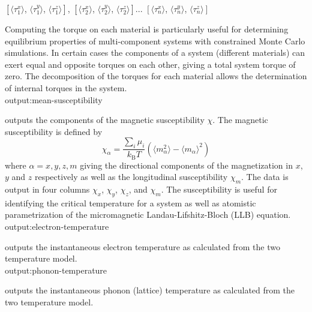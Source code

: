 \begin{center}
$\left[ \langle\tau_1^x \rangle \right.$, $\langle\tau_1^y \rangle$, $\left. \langle\tau_1^z \rangle \right]$,
$\left[ \langle\tau_2^x \rangle \right.$, $\langle\tau_2^y \rangle$, $\left. \langle\tau_2^z \rangle \right]$...
$\left[ \langle\tau_n^x \rangle \right.$, $\langle\tau_n^y \rangle$, $\left. \langle\tau_n^z \rangle \right]$
\end{center}

Computing the torque on each material is particularly useful for determining equilibrium properties of multi-component systems with constrained Monte Carlo simulations. In certain cases the components of a system (different materials) can exert equal and opposite torques on each other, giving a total system torque of zero. The decomposition of the torques for each material allows the determination of internal torques in the system.\\

{\zicf output:mean-susceptibility} outputs the components of the magnetic susceptibility $\chi$. The magnetic susceptibility is defined by
\begin{equation*}
\chi_{\alpha} = \frac{\sum_i \mu_i}{k_{\mathrm{B}}T}\left(\langle m_{\alpha}^2\rangle - \langle m_{\alpha}\rangle^2 \right)
\end{equation*}
where $\alpha = x,y,z,m$ giving the directional components of the magnetization in $x$, $y$ and $z$ respectively as well as the longitudinal susceptibility $\chi_m$. The data is output in four columns $\chi_x$, $\chi_y$, $\chi_z$, and $\chi_m$. The susceptibility is useful for identifying the critical temperature for a system as well as atomistic parametrization of the micromagnetic  Landau-Lifshitz-Bloch (LLB) equation.\\

{\zicf output:electron-temperature} outputs the instantaneous electron temperature as calculated from the two temperature model.\\

{\zicf output:phonon-temperature} outputs the instantaneous phonon (lattice) temperature as calculated from the two temperature model.\\


